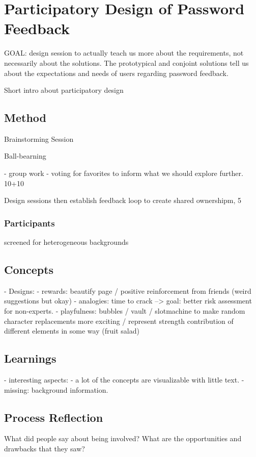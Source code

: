 \section{Participatory Design of Password Feedback}
GOAL: design session to actually teach us more about the requirements, not necessarily about the solutions. The prototypical and conjoint solutions tell us about the expectations and needs of users regarding password feedback. 

Short intro about participatory design \cite{Sanders2002ParticipatoryDesign}

\subsection{Method}

Brainstorming Session 

Ball-bearning

 - group work
 - voting for favorites to inform what we should explore further. 
10+10

Design sessions then establish feedback loop to create shared ownershipm,               5

\subsubsection{Participants}
screened for heterogeneous backgrounds

\subsection{Concepts}
- Designs:
- rewards: beautify page / positive reinforcement from friends (weird suggestions but okay)
- analogies: time to crack --> goal: better risk assessment for non-experts.
- playfulness: bubbles / vault / slotmachine to make random character replacements more exciting / represent strength contribution of different elements in some way (fruit salad)


\subsection{Learnings}

- interesting aspects:
	- a lot of the concepts are visualizable with little text.
	- missing: background information.
	

\subsection{Process Reflection}
What did people say about being involved? What are the opportunities and drawbacks that they saw?
